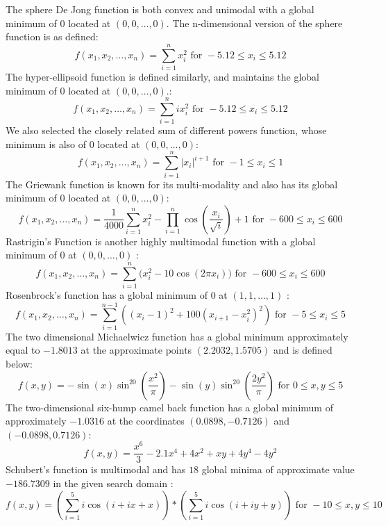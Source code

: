 %
%
The sphere De Jong function is both convex and unimodal with a global minimum of $0$ located at $(0,0,\ldots,0)$. The n-dimensional version of the sphere function is as defined\cite{molga05,yang10}:
\[ f(x_1,x_2,\ldots,x_n) = \sum\limits_{i=1}^n x_i^2 \text{ for } -5.12 \leq x_i \leq 5.12 \]
%
%
The hyper-ellipsoid function is defined similarly, and maintains the global minimum of $0$ located at $(0,0,\ldots,0)$.\cite{molga05,yang10}:
\[ f(x_1,x_2,\ldots,x_n) = \sum\limits_{i=1}^n ix_i^2 \text{ for } -5.12 \leq x_i \leq 5.12\]
%
%
We also selected the closely related sum of different powers function, whose minimum is also of $0$ located at $(0,0,\ldots,0)$\cite{molga05,yang10}:
\[ f(x_1,x_2,\ldots,x_n) = \sum\limits_{i=1}^n |x_i|^{i+1} \text{ for } -1 \leq x_i \leq 1\]
%
%
The Griewank function is known for its multi-modality and also has its global minimum of $0$ located at $(0,0,\ldots,0)$\cite{molga05,yang10}:
 \[ f(x_1,x_2,\ldots,x_n) = \frac{1}{4000}\sum\limits_{i=1}^n x_i^{2} - \prod\limits_{i=1}^{n} \cos \left(\frac{x_i}{\sqrt{i}} \right)+1 \text{ for } -600 \leq x_i \leq 600\]
 Rastrigin's Function is another highly multimodal function with a global minimum of $0$ at $(0,0,\ldots,0)$ \cite{molga05,yang10}:
 \[f(x_1,x_2,\ldots,x_n) = \sum\limits_{i=1}^n \big( x_i^2 - 10\cos(2\pi x_i) \big)\text{ for } -600 \leq x_i \leq 600\]
 Rosenbrock's function has a global minimum of 0 at $(1,1,\ldots,1)$ \cite{molga05,yang10}:
 \[f(x_1,x_2,\ldots,x_n) = \sum\limits_{i=1}^{n-1} ((x_i-1)^2 + 100(x_{i+1}-x_i^2)^2) \text{ for } -5 \leq x_i \leq 5\]
 The two dimensional Michaelwicz function has a global minimum approximately equal to $-1.8013$ at the approximate points $(2.2032,1.5705)$ and is defined below\cite{molga05,yang10}:
 \[ f(x,y) = -\sin(x)\sin^{20} \left(\frac{x^2}{\pi} \right) - \sin(y)\sin^{20} \left(\frac{2y^2}{\pi} \right) \text{ for } 0 \leq x,y \leq 5\]
 The two-dimensional six-hump camel back function has a global minimum of approximately $-1.0316$ at the coordinates $(0.0898,-0.7126)$ and $(-0.0898,0.7126)$\cite{molga05,yang10}:
 \[f(x,y) = \frac{x^6}{3}-2.1x^4+4x^2+xy+4y^4-4y^2 \]
 Schubert's function is multimodal and has $18$ global minima of approximate value $-186.7309$ in the given search domain \cite{molga05,yang10}:
 \[ f(x,y) = \left( \sum\limits_{i=1}^{5} i\cos(i + ix + x) \right) * \left( \sum\limits_{i=1}^{5} i\cos(i + iy + y) \right) \text{ for } -10 \leq x,y \leq 10 \]
 
